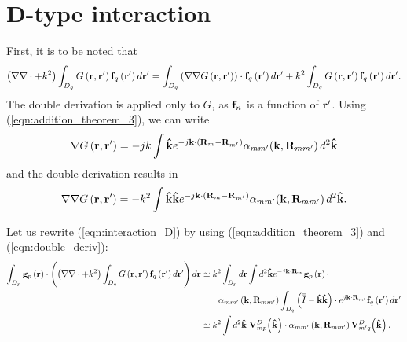 \section{D-type interaction}
%
\par
First, it is to be noted that 
\begin{equation}
\left(\nabla \nabla \cdot + k^2\right) \int_{D_q} G\left(\mathbf{r}, \mathbf{r}'\right) \mathbf{f}_q\left(\mathbf{r}'\right) d\mathbf{r}' = \int_{D_q} \left(\nabla \nabla G\left(\mathbf{r}, \mathbf{r}'\right) \right) \cdot \mathbf{f}_q\left(\mathbf{r}'\right) d\mathbf{r}' + k^2 \int_{D_q} G\left(\mathbf{r}, \mathbf{r}'\right) \mathbf{f}_q\left(\mathbf{r}'\right) d\mathbf{r}'.
\end{equation}
The double derivation is applied only to $G$, as $\mathbf{f}_n$ is a function of $\mathbf{r}'$. Using (\ref{eqn:addition_theorem_3}), we can write 
\begin{equation}\label{eqn:single_deriv}
\nabla G\left(\mathbf{r}, \mathbf{r}'\right) = -jk \int \mathbf{\hat{k}} e^{-j\mathbf{k} \cdot \left( \mathbf{R}_{m} - \mathbf{R}_{m'} \right)}  \alpha_{mm'} \! \left(\mathbf{k}, \mathbf{R}_{mm'} \right) d^2\mathbf{\hat{k}}
\end{equation}
and the double derivation results in
\begin{equation}\label{eqn:double_deriv}
\nabla \nabla G\left(\mathbf{r}, \mathbf{r}'\right) = -k^2  \int \mathbf{\hat{k}}\mathbf{\hat{k}} e^{-j\mathbf{k} \cdot \left( \mathbf{R}_{m} - \mathbf{R}_{m'} \right)}  \alpha_{mm'} \! \left(\mathbf{k}, \mathbf{R}_{mm'} \right) d^2\mathbf{\hat{k}}.
\end{equation}
%
\par
Let us rewrite (\ref{eqn:interaction_D}) by using (\ref{eqn:addition_theorem_3}) and (\ref{eqn:double_deriv}):
\begin{equation}
\begin{split}
\int_{D_p} \mathbf{g}_p\left(\mathbf{r}\right) \cdot \left(\left(\nabla \nabla \cdot + k^2\right) \int_{D_q} G\left(\mathbf{r}, \mathbf{r}'\right) \mathbf{f}_q\left(\mathbf{r}'\right) d\mathbf{r}' \right) d\mathbf{r} &\simeq k^2 \int_{D_p}d \mathbf{r} \int d^2\mathbf{\hat{k}} e^{-j\mathbf{k} \cdot \mathbf{R}_{m}}\mathbf{g}_p\left(\mathbf{r}\right) \cdot \\ & \qquad \alpha_{mm'}\left(\mathbf{k}, \mathbf{R}_{mm'}\right) \int_{D_q} \left( \overline{\overline{I}}-\mathbf{\hat{k}}\mathbf{\hat{k}} \right) \cdot e^{j\mathbf{k} \cdot \mathbf{R}_{m'}} \mathbf{f}_q\left(\mathbf{r}'\right) d \mathbf{r}' \\
&\simeq k^2 \int d^2\mathbf{\hat{k}} \; \mathbf{V}_{mp}^D \! \left(\mathbf{\hat{k}}\right) \cdot \alpha_{mm'}\left(\mathbf{k}, \mathbf{R}_{mm'} \right) \mathbf{V}_{m'q}^D \! \left(\mathbf{\hat{k}}\right).
\end{split}
\end{equation}
